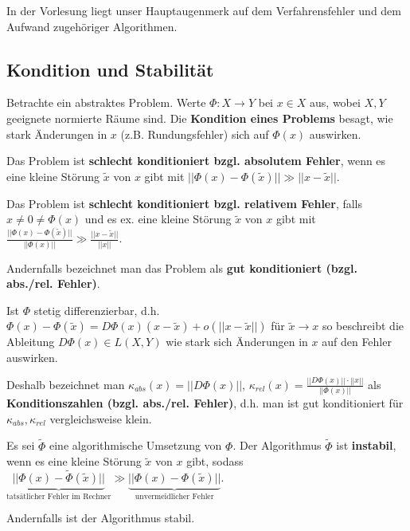 In der Vorlesung liegt unser Hauptaugenmerk auf dem Verfahrensfehler und dem Aufwand zugehöriger Algorithmen.


\subsection{Kondition und Stabilität}

Betrachte ein abstraktes Problem. Werte $\Phi: X \rightarrow Y$ bei $x\in X$ aus, wobei $X,Y$ geeignete normierte Räume sind. Die \textbf{Kondition eines Problems} besagt, wie stark Änderungen in $x$ (z.B. Rundungsfehler) sich auf $\Phi(x)$ auswirken.

\begin{definition}
	Das Problem ist \textbf{schlecht konditioniert bzgl. absolutem Fehler}, wenn es eine kleine Störung $\tilde{x}$ von $x$ gibt mit $||\Phi(x)-\Phi(\tilde{x})|| \gg ||x-\tilde{x}||$.
	
	Das Problem ist \textbf{schlecht konditioniert bzgl. relativem Fehler}, falls $x \neq 0 \neq \Phi(x)$ und es ex. eine kleine Störung $\tilde{x}$ von $x$ gibt mit $\frac{||\Phi(x)-\Phi(\tilde{x})||}{||\Phi(x)||} \gg \frac{||x-\tilde{x}||}{||x||}$.
	
	Andernfalls bezeichnet man das Problem als \textbf{gut konditioniert (bzgl. abs./rel. Fehler)}.
\end{definition}

\begin{remark}
	Ist $\Phi$ stetig differenzierbar, d.h. $\Phi(x) - \Phi(\tilde{x}) = D\Phi(x)(x-\tilde{x}) + o(||x-\tilde{x}||)$ für $\tilde{x}\rightarrow x$ so beschreibt die Ableitung $D\Phi(x) \in L(X,Y)$ wie stark sich Änderungen in $x$ auf den Fehler auswirken.
	
	Deshalb bezeichnet man $\kappa_{abs}(x) = ||D\Phi(x)||$, $\kappa_{rel}(x) = \frac{||D\Phi(x)|| \cdot ||x||}{||\Phi(x)||}$ als \textbf{Konditionszahlen (bzgl. abs./rel. Fehler)}, d.h. man ist gut konditioniert für $\kappa_{abs}, \kappa_{rel}$ vergleichsweise klein.
\end{remark}

\begin{definition}
	Es sei $\tilde{\Phi}$ eine algorithmische Umsetzung von $\Phi$. Der Algorithmus $\tilde{\Phi}$ ist \textbf{instabil}, wenn es eine kleine Störung $\tilde{x}$ von $x$ gibt, sodass $\underbrace{||\Phi(x)-\tilde{\Phi}(\tilde{x})||}_{\text{tatsätlicher Fehler im Rechner}} \gg \underbrace{||\Phi(x)-\Phi(\tilde{x})||}_{\text{unvermeidlicher Fehler}}$.
	
	Andernfalls ist der Algorithmus stabil.
\end{definition}

